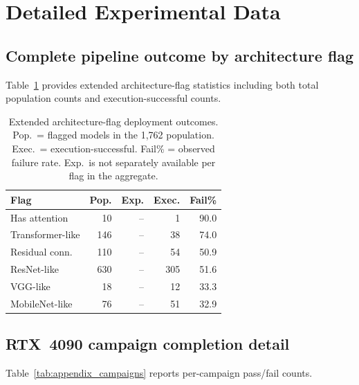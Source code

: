 \documentclass[10pt,twocolumn,letterpaper]{article}
\begin{document}
{\small


}

\appendix

\section{Detailed Experimental Data}\label{sec:appendix}

\subsection{Complete pipeline outcome by architecture flag}

Table~\ref{tab:appendix_families} provides extended architecture-flag statistics including both total population counts and execution-successful counts.

\begin{table}[h]
\centering\small
\begin{tabular}{lrrrr}
\toprule
Flag & Pop. & Exp. & Exec. & Fail\% \\
\midrule
Has attention & 10 & -- & 1 & 90.0 \\
Transformer-like & 146 & -- & 38 & 74.0 \\
Residual conn. & 110 & -- & 54 & 50.9 \\
ResNet-like & 630 & -- & 305 & 51.6 \\
VGG-like & 18 & -- & 12 & 33.3 \\
MobileNet-like & 76 & -- & 51 & 32.9 \\
\bottomrule
\end{tabular}
\caption{Extended architecture-flag deployment outcomes. Pop.\ = flagged models in the 1,762 population. Exec.\ = execution-successful. Fail\% = observed failure rate. Exp.\ is not separately available per flag in the aggregate.}
\label{tab:appendix_families}
\end{table}

\subsection{RTX~4090 campaign completion detail}

Table~\ref{tab:appendix_campaigns} reports per-campaign pass/fail counts.
\end{document}
